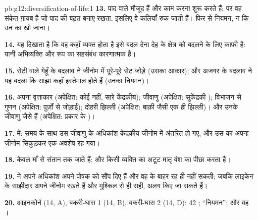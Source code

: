 \begin{solution}{pb:g12:diversification-of-life:1}
\textbf{13.} पाद वाले  मौजूद हैं और काम करना शुरू करते हैं; पर वह संकेत
ग़ायब है जो पाद की बढ़त बनाए रखता, इसलिए वे कलियाँ रुक जाती हैं। फिर से
नियमन, न कि उन  का खो जाना।

\textbf{14.} यह दिखाता है कि वह  कहाँ व्यक्त होता है इसे बदल देना देह के
क्षेत्र को बदलने के लिए काफ़ी है: यानी अभिव्यक्ति और रूप का सहसंबंध कारणात्मक
है।

\textbf{15.} रोटी वाले गेहूँ के बदलाव ने जीनोम में पूरे-पूरे सेट जोड़े
(उसका आकार); और अजगर के बदलाव ने यह बदला कि साझा  कहाँ इस्तेमाल होते हैं
(उनका नियमन)।

\textbf{16.} अपना वृत्ताकार  (अपेक्षित: कोई नहीं, सारे  केंद्रकीय);
जीवाणु  (अपेक्षित: सुकेंद्रकी ); विभाजन से गुणन (अपेक्षित:
पुर्ज़ों से जोड़ाई); दोहरी झिल्ली (अपेक्षित: बाक़ी  जैसी एक ही
झिल्ली)। और उनके  जीवाणु  जैसे हैं (अपेक्षित:  प्रकार के
)।

\textbf{17.}  में: समय के साथ उस जीवाणु के अधिकांश  केंद्रकीय
जीनोम में अंतरित हो गए, और उस  का अपना जीनोम सिकुड़कर एक अवशेष रह
गया।

\textbf{18.}   केवल माँ से संतान तक जाते हैं; और किसी व्यक्ति
का   अटूट मातृ वंश का पीछा करता है।

\textbf{19.}  ने अपने अधिकांश  अपने पोषक को सौंप दिए हैं और वह
 के बाहर रह ही नहीं सकती; जबकि लाइकेन के साझीदार अपने जीनोम रखते हैं
और मुश्किल से ही सही, अलग किए जा सकते हैं।

\textbf{20.} आइनकोर्न (14, A), बकरी-घास 1 (14, B), बकरी-घास 2 (14, D):
42 ; ``नियमन''; और वह ।
\end{solution}

